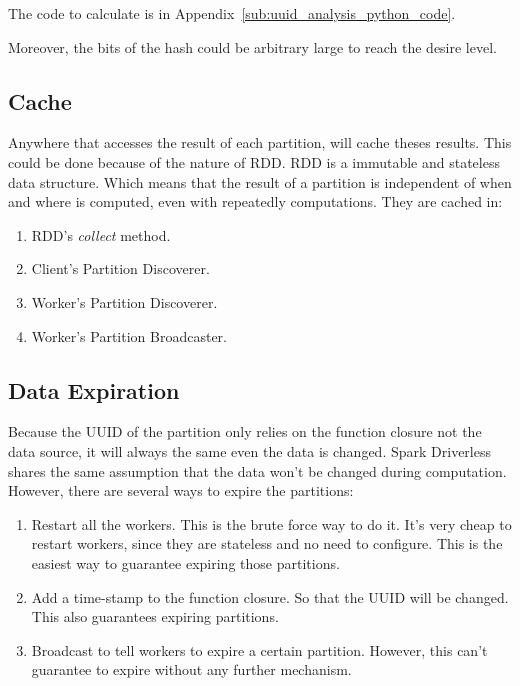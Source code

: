 The code to calculate is in Appendix~\ref{sub:uuid_analysis_python_code}.

Moreover, the bits of the hash could be arbitrary large to reach the desire level.

\subsection{Cache} %
\label{sub:cache}
Anywhere that accesses the result of each partition, will cache theses results.
This could be done because of the nature of RDD\@.
RDD is a immutable and stateless data structure.
Which means that the result of a partition is independent of when and where is computed,
even with repeatedly computations.
They are cached in:
\begin{enumerate}
    \item RDD's \emph{collect} method.
    \item Client's Partition Discoverer.
    \item Worker's Partition Discoverer.
    \item Worker's Partition Broadcaster.
\end{enumerate}

\subsection{Data Expiration} %
\label{sub:data_expiration}
Because the UUID of the partition only relies on the function closure not the data source,
it will always the same even the data is changed.
Spark Driverless shares the same assumption that the data won't be changed during computation.
However, there are several ways to expire the partitions:
\begin{enumerate}
    \item Restart all the workers.
    This is the brute force way to do it.
    It's very cheap to restart workers, since they are stateless and no need to configure.
    This is the easiest way to guarantee expiring those partitions.
    \item Add a time-stamp to the function closure.
    So that the UUID will be changed.
    This also guarantees expiring partitions.
    \item Broadcast to tell workers to expire a certain partition.
    However, this can't guarantee to expire without any further mechanism.
\end{enumerate}

